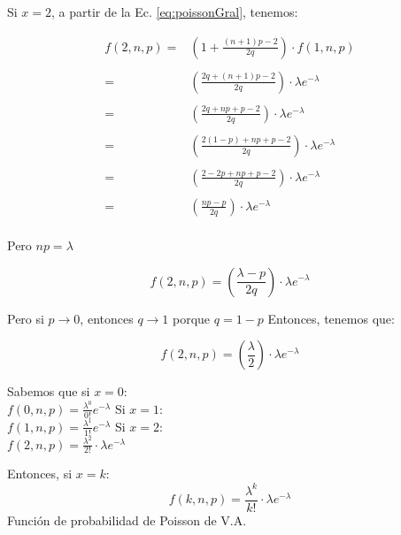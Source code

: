 \documentclass{beamer}
\begin{document}
\begin{frame}{}
  Si $x=2$, a partir de la Ec. \eqref{eq:poissonGral}, tenemos:

  \begin{equation}
    \begin{array}{rl}
    f(2,n,p)  = & (1 + \frac{(n+1)p - 2}{2q}) \cdot f(1,n,p) \\
    \\
              = & (\frac{2q + (n+1)p - 2}{2q}) \cdot \lambda e^{-\lambda} \\
    \\
              = & (\frac{2q + np + p - 2}{2q}) \cdot \lambda e^{-\lambda} \\
    \\
              = & (\frac{2(1-p) + np + p - 2}{2q}) \cdot \lambda e^{-\lambda} \\
    \\
              = & (\frac{2 - 2p + np + p - 2}{2q}) \cdot \lambda e^{-\lambda} \\
    \\
              = & (\frac{np - p}{2q}) \cdot \lambda e^{-\lambda} \\

    \end{array}
  \end{equation}

  Pero $np=\lambda$

\end{frame}

\begin{frame}{}
  \begin{equation}
    f(2,n,p)  = (\frac{\lambda - p}{2q}) \cdot \lambda e^{-\lambda}
  \end{equation}

  Pero si $p \to 0$, entonces $q \to 1$ porque $q=1-p$
  Entonces, tenemos que:

  \begin{equation}
    f(2,n,p)  = (\frac{\lambda}{2}) \cdot \lambda e^{-\lambda}
  \end{equation}



\end{frame}

\begin{frame}{}
  Sabemos que si $x=0$: \\
  $f(0,n,p) = \frac{\lambda^0}{0!} e^{-\lambda}$
  \vfill
  Si $x=1$: \\
  $f(1,n,p) = \frac{\lambda^1}{1!} e^{-\lambda}$
  \vfill
  Si $x=2$: \\
  $f(2,n,p)  = \frac{\lambda^2}{2!} \cdot \lambda e^{-\lambda}$
  \vfill

  \begin{block}{}
    Entonces, si $x=k$:
    \begin{equation}
      f(k,n,p)  = \frac{\lambda^k}{k!} \cdot \lambda e^{-\lambda}
    \end{equation}
    Función de probabilidad de Poisson de V.A.
  
  \end{block}
\end{frame}
\end{document}
